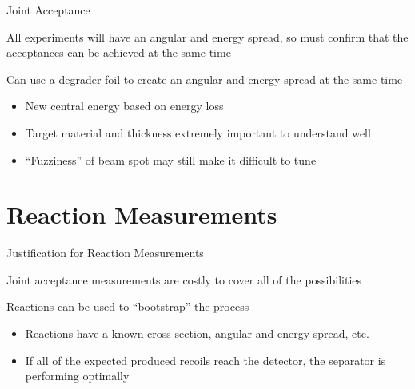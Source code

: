 \documentclass[10pt]{beamer}
\begin{document}
\begin{frame}[fragile]{Joint Acceptance}

    All experiments will have an angular and energy spread, so must
    confirm that the acceptances can be achieved at the same time

    Can use a degrader foil to create an angular and energy spread at
    the same time
    \begin{itemize}
        \item New central energy based on energy loss
        \item Target material and thickness extremely important to
            understand well
        \item ``Fuzziness'' of beam spot may still make it difficult
            to tune
    \end{itemize}

\end{frame}

\section{Reaction Measurements}

\begin{frame}[fragile]{Justification for Reaction Measurements}

    Joint acceptance measurements are costly to cover all of the
    possibilities

    Reactions can be used to ``bootstrap'' the process
    \begin{itemize}
        \item Reactions have a known cross section, angular and energy
            spread, etc.
        \item If all of the expected produced recoils reach the
            detector, the separator is performing optimally
    \end{itemize}

\end{frame}
\end{document}
